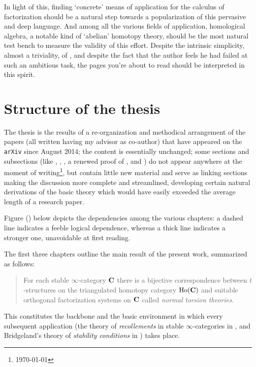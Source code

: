 In light of this, finding `concrete' means of application for the calculus of factorization should be a natural step towards a popularization of this pervasive and deep language. And among all the various fields of application, homological algebra, a notable kind of `abelian' homotopy theory, should be the most natural test bench to measure the validity of this effort. Despite the intrinsic simplicity, almost a triviality, of \athm {}, and despite the fact that the author feels he had failed at such an ambitious task, the pages you're about to read should be interpreted in this spirit.
\section*{Structure of the thesis}
The thesis is the results of a re\hyp{}organization and methodical arrangement of the papers \cite{FL0,heart,recol,infty-stab} (all written having my advisor as co\hyp{}author) that have appeared on the {\tt arXiv} since August 2014; the content is essentially unchanged; some sections and subsections (like \eg {}, , , a renewed proof of , and \achap {}) do not appear anywhere at the moment of writing\footnote{\today}, but contain little new material and serve as linking sections making the discussion more complete and streamlined, developing certain natural derivations of the basic theory which would have easily exceeded the average length of a research paper.

Figure () below depicts the dependencies among the various chapters: a dashed line indicates a feeble logical dependence, whereas a thick line indicates a stronger one, unavoidable at first reading.

The first three chapters outline the main result of the present work, summarized as follows:
\begin{quote}
For each stable $\infty$\hyp{}category $\mathbf{C}$ there is a bijective correspondence between $t$\hyp{}structures on the triangulated homotopy category $\text{Ho}(\mathbf{C})$ and suitable orthogonal factorization systems on $\mathbf{C}$ called \emph{normal torsion theories}.
\end{quote}
This constitutes the backbone and the basic environment in which every subsequent application (the theory of \emph{recollements} in stable $\infty$\hyp{}categories in \achap {}, and Bridgeland's theory of \emph{stability conditions} in \achap {}) takes place.

